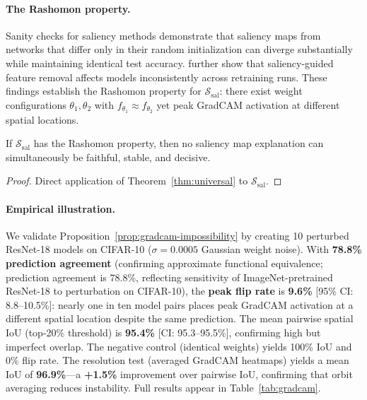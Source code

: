 \paragraph{The Rashomon property.}
Sanity checks for saliency methods \citep{adebayo2018sanity} demonstrate
that saliency maps from networks that differ only in their random
initialization can diverge substantially while maintaining identical test
accuracy.  \citet{hooker2019benchmark} further show that saliency-guided
feature removal affects models inconsistently across retraining runs.
These findings establish the Rashomon property for
$\mathcal{S}_{\mathrm{sal}}$: there exist weight configurations $\theta_1,
\theta_2$ with $f_{\theta_1} \approx f_{\theta_2}$ yet peak GradCAM
activation at different spatial locations.

\begin{proposition}
\label{prop:gradcam-impossibility}
If $\mathcal{S}_{\mathrm{sal}}$ has the Rashomon property, then no
saliency map explanation can simultaneously be faithful, stable, and
decisive.
\end{proposition}

\begin{proof}
Direct application of Theorem~\ref{thm:universal} to
$\mathcal{S}_{\mathrm{sal}}$.
\end{proof}

\paragraph{Empirical illustration.}
We validate Proposition~\ref{prop:gradcam-impossibility} by creating 10
perturbed ResNet-18 models on CIFAR-10 ($\sigma = 0.0005$ Gaussian weight
noise).  With \textbf{78.8\% prediction agreement} (confirming approximate
functional equivalence; prediction agreement is 78.8\%, reflecting
sensitivity of ImageNet-pretrained ResNet-18 to perturbation on CIFAR-10),
the \textbf{peak flip rate} is \textbf{9.6\%}
[95\% CI: 8.8--10.5\%]: nearly one in ten model pairs places peak GradCAM
activation at a different spatial location despite the same prediction.
The mean pairwise spatial IoU (top-20\% threshold) is \textbf{95.4\%}
[CI: 95.3--95.5\%], confirming high but imperfect overlap.
The negative control (identical weights) yields 100\% IoU and 0\% flip
rate.  The resolution test (averaged GradCAM heatmaps) yields a mean IoU
of \textbf{96.9\%}---a \textbf{+1.5\%} improvement over pairwise IoU,
confirming that orbit averaging reduces instability.
Full results appear in Table~\ref{tab:gradcam}.

